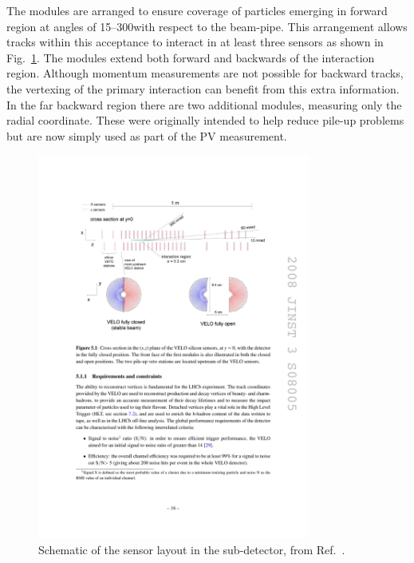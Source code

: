 The \velo modules are arranged to ensure coverage of particles emerging in forward region at angles of 15--300\mrad with respect to the beam-pipe. This arrangement allows tracks within this acceptance to interact in at least three sensors as shown in Fig.~\ref{fig:Dec_velo_sensor_layout}.   
The modules extend both forward and backwards of the interaction region. Although momentum measurements are not possible for backward tracks, the vertexing of the primary interaction can benefit from this extra information. In the far backward region there are two additional modules, measuring only the radial coordinate. 
These were originally intended to help reduce pile-up problems but are now simply used as part of the PV measurement.

\begin{figure}[!h]
    \centering
    \includegraphics[width=0.8\textwidth]{figs/Detector/velo_sensor_layout.pdf}
    \caption{Schematic of the sensor layout in the \velo sub-detector, from Ref.~\cite{LHCb-DP-2014-001}.}
    \label{fig:Dec_velo_sensor_layout}   
\end{figure}

